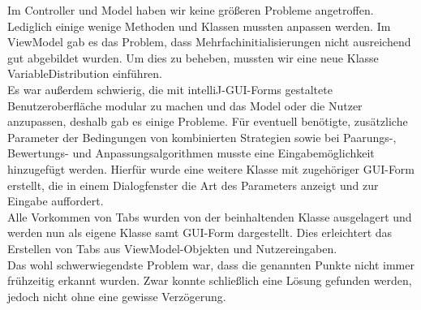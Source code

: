 Im Controller und Model haben wir keine größeren Probleme angetroffen. Lediglich einige wenige Methoden und Klassen mussten anpassen werden. %
Im ViewModel gab es das Problem, dass Mehrfachinitialisierungen nicht ausreichend gut abgebildet wurden. Um dies zu beheben, mussten wir eine neue Klasse VariableDistribution einführen. \\
Es war außerdem schwierig, die mit intelliJ-GUI-Forms gestaltete Benutzeroberfläche modular zu machen und das Model oder die Nutzer anzupassen, deshalb gab es einige Probleme. %
Für eventuell benötigte, zusätzliche Parameter der Bedingungen von kombinierten Strategien sowie bei Paarungs-, Bewertungs- und Anpassungsalgorithmen musste eine Eingabemöglichkeit hinzugefügt werden. Hierfür wurde eine weitere Klasse mit zugehöriger GUI-Form erstellt, die in einem Dialogfenster die Art des Parameters anzeigt und zur Eingabe auffordert.\\
Alle Vorkommen von Tabs wurden von der beinhaltenden Klasse ausgelagert und werden nun als eigene Klasse samt GUI-Form dargestellt. Dies erleichtert das Erstellen von Tabs aus ViewModel-Objekten und Nutzereingaben.\\
Das wohl schwerwiegendste Problem war, dass die genannten Punkte nicht immer frühzeitig erkannt wurden. Zwar konnte schließlich eine Lösung gefunden werden, jedoch nicht ohne eine gewisse Verzögerung.